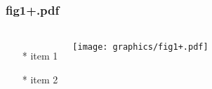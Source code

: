 \begin{frame} \frametitle{fig1+.pdf}
    \begin{columns}[c]
        \begin{itemize}
            \item[*] item 1
            \item[*] item 2
        \end{itemize}
        \begin{minipage}{\linewidth}
            \begin{center}
            \texttt{[image: graphics/fig1+.pdf]}
            \label{gfx:fig1+.pdf}
            \end{center}
        \end{minipage}
    \end{columns}
\end{frame}
